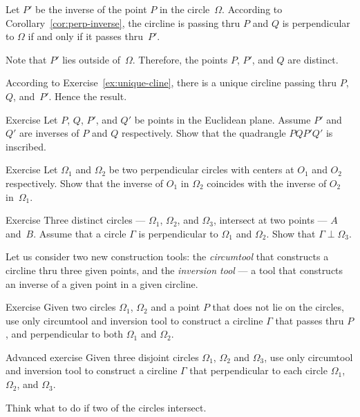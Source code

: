 Let $P'$ be the inverse of the point $P$ in the circle~$\Omega$.
According to Corollary~\ref{cor:perp-inverse},
the circline is passing thru $P$ and $Q$ 
is perpendicular to $\Omega$ if and only if it passes thru~$P'$.

Note that $P'$ lies outside of~$\Omega$.
Therefore, the points $P$, $P'$, and $Q$ are distinct.

According to Exercise~\ref{ex:unique-cline},
there is a unique circline passing thru $P$, $Q$, and~$P'$.
Hence the result.
\qeds

\begin{thm}{Exercise}\label{ex:inscribed+inv}
Let $P$, $Q$, $P'$, and $Q'$ be points in the Euclidean plane.
Assume $P'$ and $Q'$ are inverses of $P$ and $Q$ respectively.
Show that the quadrangle $PQP'Q'$ is inscribed.
\end{thm}

\begin{thm}{Exercise}\label{ex:centers-of-perp-circles}
Let $\Omega_1$ and $\Omega_2$ be two perpendicular circles with centers at $O_1$ and $O_2$ respectively.
Show that the inverse of $O_1$ in $\Omega_2$ 
coincides with 
the inverse of $O_2$ in~$\Omega_1$.
\end{thm}

\begin{thm}{Exercise}\label{ex:4-th-perp-circ}
Three distinct circles --- $\Omega_1$, $\Omega_2$, and $\Omega_3$, intersect at two points --- $A$ and~$B$.
Assume that a circle $\Gamma$ is perpendicular to $\Omega_1$ and $\Omega_2$.
Show that $\Gamma\perp\Omega_3$.
\end{thm}

Let us consider two new construction tools:
the \emph{circumtool} that constructs a circline thru three given points, 
and the \emph{inversion tool} --- a tool that constructs an inverse of a given point in a given circline.

\begin{thm}{Exercise}\label{ex:construction-perp-clines}
Given  two circles $\Omega_1$, $\Omega_2$ and a point $P$ that does not lie on the circles,
use only circumtool and inversion tool to construct a circline $\Gamma$ that passes thru $P$, 
and perpendicular to both $\Omega_1$ and $\Omega_2$.
\end{thm}

\begin{thm}{Advanced exercise}\label{ex:3-construction-perp-clines}
Given  three disjoint circles $\Omega_1$, $\Omega_2$ and $\Omega_3$,
use only circumtool and inversion tool to construct a circline $\Gamma$ that perpendicular to each circle $\Omega_1$, $\Omega_2$, and $\Omega_3$.

Think what to do if two of the circles intersect.
\end{thm}

